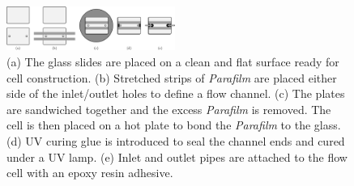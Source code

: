 \begin{figure}
\begin{center}
\includegraphics[width=0.49\textwidth]{Figures/45/cell_fabrication}
\end{center}
\caption[Cell fabrication]{\label{fig:cell_fabrication}(a) The glass slides are placed on a clean and flat surface ready for cell construction. (b) Stretched strips of \textit{Parafilm} are placed either side of the inlet/outlet holes to define a flow channel. (c) The plates are sandwiched together and the excess \textit{Parafilm} is removed. The cell is then placed on a hot plate to bond the  \textit{Parafilm} to the glass. (d) UV curing glue is introduced to seal the channel ends and cured under a UV lamp. (e) Inlet and outlet pipes are attached to the flow cell with an epoxy resin adhesive.}
\end{figure}

